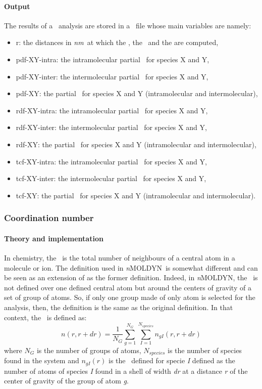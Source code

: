 \documentclass[a4paper,11pt]{report}
\newcommand{\nm}{\textit{nm}}
\newcommand{\NMOLDYN}{\textit{n}MOLDYN}
\begin{document}
\paragraph{Output\\}
The results of a \PDF\ analysis are stored in a \NetCDF\ file whose main variables are namely:
\begin{itemize}
\item r: the distances in \nm\ at which the \PDF , the \RDF\ and the \TCF are computed,
\item pdf-XY-intra: the intramolecular partial \PDF\ for species X and Y,
\item pdf-XY-inter: the intermolecular partial \PDF\ for species X and Y,
\item pdf-XY: the partial \PDF\ for species X and Y (intramolecular and intermolecular),
\item rdf-XY-intra: the intramolecular partial \RDF\ for species X and Y,
\item rdf-XY-inter: the intermolecular partial \RDF\ for species X and Y,
\item rdf-XY: the partial \RDF\ for species X and Y (intramolecular and intermolecular),
\item tcf-XY-intra: the intramolecular partial \TCF\ for species X and Y,
\item tcf-XY-inter: the intermolecular partial \TCF\ for species X and Y,
\item tcf-XY: the partial \TCF\ for species X and Y (intramolecular and intermolecular).
\end{itemize}

\subsubsection{Coordination number}
\label{cn}
\paragraph{Theory and implementation\\}
\label{cn_theory}
In chemistry, the \CN\ is the total number of neighbours of a central atom in a molecule or ion. The definition used in \NMOLDYN\ is somewhat 
different and can be seen as an extension of as the former definition. Indeed, in \NMOLDYN, the \CN\ is not defined over one defined central atom but around 
the centers of gravity of a set of group of atoms. So, if only one group made of only atom is selected for the analysis, then, the 
definition is the same as the original definition. In that context, the \CN\ is defined as:
\begin{equation}
n(r, r+dr) = \frac{1}{N_{G}}\sum_{g=1}^{N_{G}}\sum_{I=1}^{N_{species}} n_{gI}(r, r+dr)
\end{equation}
where $N_{G}$ is the number of groups of atoms, $N_{species}$ is the number of species found in the system and 
$n_{gI}(r)$ is the \CN\ defined for specie \textit{I} defined as the number of atoms of species \textit{I} found 
in a shell of width \textit{dr} at a distance \textit{r} of the center of gravity of the group of atom \textit{g}.
\end{document}
